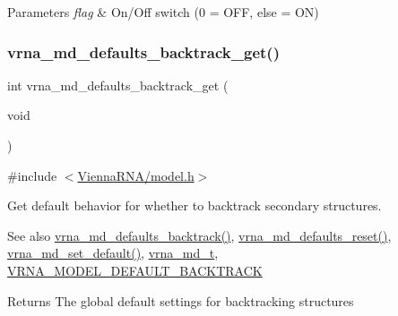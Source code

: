 \begin{DoxyParams}{Parameters}
{\em flag} & On/\+Off switch (0 = O\+FF, else = ON) \\
\hline
\end{DoxyParams}
\mbox{\label{group__model__details_ga90da1156e6883ddd68527c2830706648}} 
\subsubsection{\texorpdfstring{vrna\_md\_defaults\_backtrack\_get()}{vrna\_md\_defaults\_backtrack\_get()}}
{\footnotesize\ttfamily int vrna\+\_\+md\+\_\+defaults\+\_\+backtrack\+\_\+get (\begin{DoxyParamCaption}\item[{void}]{ }\end{DoxyParamCaption})}



{\ttfamily \#include $<$\mbox{\hyperlink{model_8h}{Vienna\+R\+N\+A/model.\+h}}$>$}



Get default behavior for whether to backtrack secondary structures. 

\begin{DoxySeeAlso}{See also}
\mbox{\hyperlink{group__model__details_ga978c468b2fe96a70d5191e3dd17d5599}{vrna\+\_\+md\+\_\+defaults\+\_\+backtrack()}}, \mbox{\hyperlink{group__model__details_ga70834424cf804d149937de89f80ceb45}{vrna\+\_\+md\+\_\+defaults\+\_\+reset()}}, \mbox{\hyperlink{group__model__details_ga8ac6ff84936282436f822644bf841f66}{vrna\+\_\+md\+\_\+set\+\_\+default()}}, \mbox{\hyperlink{group__model__details_ga1f8a10e12a0a1915f2a4eff0b28ea17c}{vrna\+\_\+md\+\_\+t}}, \mbox{\hyperlink{group__model__details_ga3fda8006ab84baf817bd8e5ccbc6bb35}{V\+R\+N\+A\+\_\+\+M\+O\+D\+E\+L\+\_\+\+D\+E\+F\+A\+U\+L\+T\+\_\+\+B\+A\+C\+K\+T\+R\+A\+CK}} 
\end{DoxySeeAlso}
\begin{DoxyReturn}{Returns}
The global default settings for backtracking structures 
\end{DoxyReturn}
\mbox{\label{group__model__details_ga68305274de96b56b7799575e222560d8}} 
